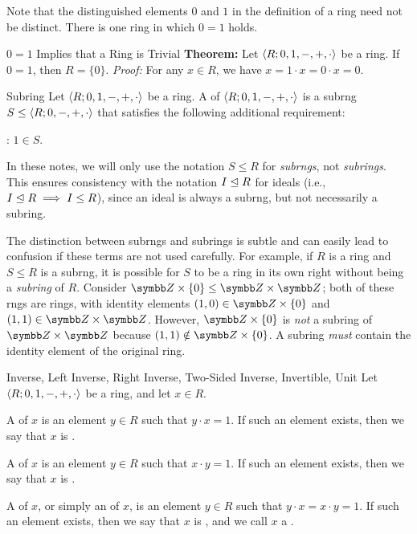 \documentclass[12pt]{report}
\begin{document}
Note that the distinguished elements $0$ and $1$ in the definition of a ring need not be distinct. There is one ring in which $0 = 1$ holds.

\begin{thmbox}{$0=1$ Implies that a Ring is Trivial}
	\textbf{Theorem:} Let ${\langle {R; 0, 1, -, +, \cdot} \rangle}$ be a ring. If $0 = 1$, then $R = \{0\}$.
\tcblower
	\textit{Proof:} For any $x \in R$, we have $x = 1 \cdot x = 0 \cdot x = 0$.
\end{thmbox}

\begin{dfnbox}{Subring}
	Let ${\langle {R; 0, 1, -, +, \cdot} \rangle}$ be a ring. A  of ${\langle {R; 0, 1, -, +, \cdot} \rangle}$ is a subrng $S \le {\langle {R; 0, -, +, \cdot} \rangle}$ that satisfies the following additional requirement:
	\begin{dfnitems}
		\item {}: $1 \in S$.
	\end{dfnitems}
\end{dfnbox}

In these notes, we will only use the notation $S \le R$ for \textit{subrngs}, not \textit{subrings}. This ensures consistency with the notation $I \trianglelefteq R$ for ideals (i.e., $I \trianglelefteq R \implies I \le R$), since an ideal is always a subrng, but not necessarily a subring.

The distinction between subrngs and subrings is subtle and can easily lead to confusion if these terms are not used carefully. For example, if $R$ is a ring and $S \le R$ is a subrng, it is possible for $S$ to be a ring in its own right without being a \textit{subring} of $R$. Consider $\Z \times \{0\} \le \Z \times \Z$; both of these rngs are rings, with identity elements $(1, 0) \in \Z \times \{0\}$ and $(1, 1) \in \Z \times \Z$. However, $\Z \times \{0\}$ is \textit{not} a subring of $\Z \times \Z$ because $(1, 1) \notin \Z \times \{0\}$. A subring \textit{must} contain the identity element of the original ring.

\begin{dfnbox}{Inverse, Left Inverse, Right Inverse, Two-Sided Inverse, Invertible, Unit}
	Let ${\langle {R; 0, 1, -, +, \cdot} \rangle}$ be a ring, and let $x \in R$.
	\begin{dfnitems}
		\item A  of $x$ is an element $y \in R$ such that $y \cdot x = 1$. If such an element exists, then we say that $x$ is \dfntxt{left-invertible}.
		\item A  of $x$ is an element $y \in R$ such that $x \cdot y = 1$. If such an element exists, then we say that $x$ is \dfntxt{right-invertible}.
		\item A  of $x$, or simply an  of $x$, is an element $y \in R$ such that $y \cdot x = x \cdot y = 1$. If such an element exists, then we say that $x$ is , and we call $x$ a \dfntxt{unit}.
	\end{dfnitems}
\end{dfnbox}
\end{document}
